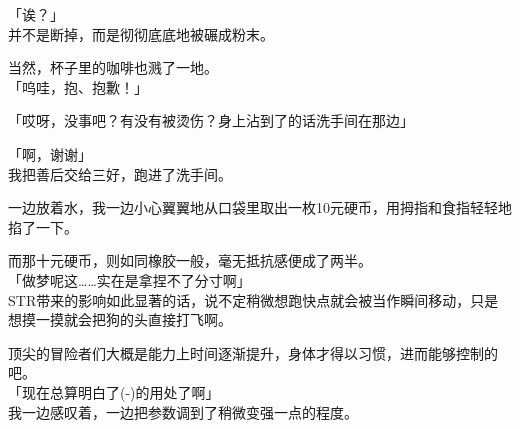 「诶？」\\

并不是断掉，而是彻彻底底地被碾成粉末。

当然，杯子里的咖啡也溅了一地。\\

「呜哇，抱、抱歉！」

「哎呀，没事吧？有没有被烫伤？身上沾到了的话洗手间在那边」

「啊，谢谢」\\

我把善后交给三好，跑进了洗手间。

一边放着水，我一边小心翼翼地从口袋里取出一枚10元硬币，用拇指和食指轻轻地掐了一下。

而那十元硬币，则如同橡胶一般，毫无抵抗感便成了两半。\\

「做梦呢这……实在是拿捏不了分寸啊」\\

STR带来的影响如此显著的话，说不定稍微想跑快点就会被当作瞬间移动，只是想摸一摸就会把狗的头直接打飞啊。

顶尖的冒险者们大概是能力上时间逐渐提升，身体才得以习惯，进而能够控制的吧。\\

「现在总算明白了(-)的用处了啊」\\

我一边感叹着，一边把参数调到了稍微变强一点的程度。\\

